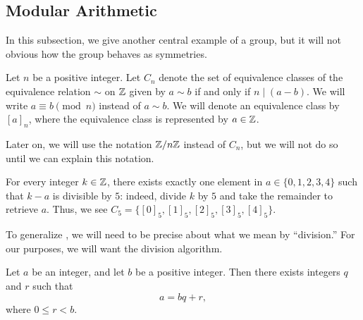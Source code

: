 \documentclass[../main.tex]{subfiles}
\begin{document}
\subsection{Modular Arithmetic} \label{subsec:mods}
In this subsection, we give another central example of a group, but it will not obvious how the group behaves as symmetries.
\begin{definition}
    Let $n$ be a positive integer. Let $C_n$ denote the set of equivalence classes of the equivalence relation $\sim$ on $\mathbb Z$ given by $a\sim b$ if and only if $n\mid(a-b)$. We will write $a\equiv b\pmod n$ instead of $a\sim b$. We will denote an equivalence class by $[a]_n$, where the equivalence class is represented by $a\in\mathbb Z$.
\end{definition}
Later on, we will use the notation $\mathbb Z/n\mathbb Z$ instead of $C_n$, but we will not do so until we can explain this notation.
\begin{example} \label{ex:mod-5}
    For every integer $k\in\mathbb Z$, there exists exactly one element in $a\in\{0,1,2,3,4\}$ such that $k-a$ is divisible by $5$: indeed, divide $k$ by $5$ and take the remainder to retrieve $a$. Thus, we see $C_5=\{[0]_5,[1]_5,[2]_5,[3]_5,[4]_5\}$.
\end{example}
To generalize , we will need to be precise about what we mean by ``division.'' For our purposes, we will want the division algorithm.
\begin{theorem} \label{thm:division}
    Let $a$ be an integer, and let $b$ be a positive integer. Then there exists integers $q$ and $r$ such that
    \[a=bq+r,\]
    where $0\le r<b$.
\end{theorem}
\end{document}
